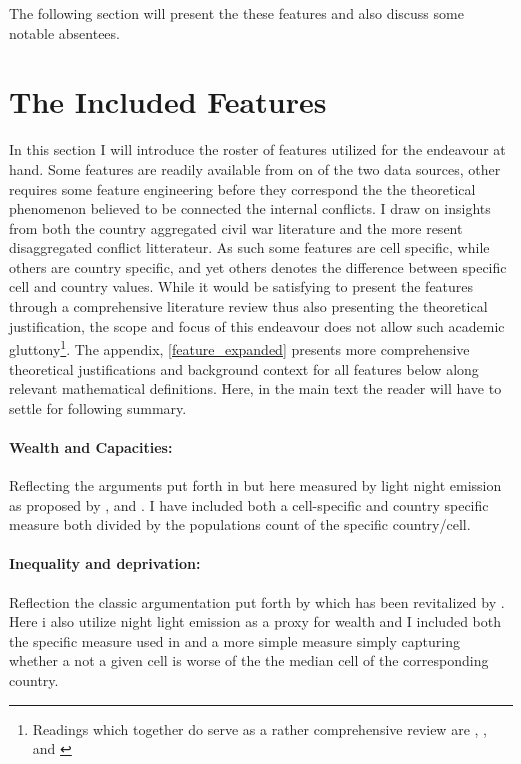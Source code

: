 \documentclass[a4paper]{article}
\begin{document}
The following section will present the these features and also discuss some notable absentees.\par

\section{The Included Features}

In this section I will introduce the roster of features utilized for the endeavour at hand. Some features are readily available from on of the two data sources, other requires some feature engineering before they correspond the the theoretical phenomenon believed to be connected the internal conflicts. I draw on insights from both the country aggregated civil war literature and the more resent disaggregated conflict litterateur. As such some features are cell specific, while others are country specific, and yet others denotes the difference between specific cell and country values. While it would be satisfying to present the features through a comprehensive literature review thus also presenting the theoretical justification, the scope and focus of this endeavour does not allow such academic gluttony\footnote{Readings which together do serve as a rather comprehensive review are \cite{Hegre_Sambanis_2006}, \cite{Kalyvas_2007}, \cite{Cederman_Gleditsch_2009} and \cite{Blattman_Miguel_2010}}. The appendix, \autoref{feature_expanded} presents more comprehensive theoretical justifications and background context for all features below along relevant mathematical definitions. Here, in the main text the reader will have to settle for following summary.

\paragraph{Wealth and Capacities:} Reflecting the arguments put forth in \cite{Collier_Hoeffler_1998, Fearon_Laitin_2003, Collier_Hoeffler_2004} but here measured by light night emission as proposed by \cite{Elvidge_2009}, \cite{Chen_Nordhuas_2011} and \cite{Cederman_Gleditsch_Buhaug_2013}. I have included both a cell-specific and country specific measure both divided by the populations count of the specific country/cell.\par

\paragraph{Inequality and deprivation:} Reflection the classic argumentation put forth by \cite{Gurr_1970} which has been revitalized by \cite{Cederman_Gleditsch_Buhaug_2013}. Here i also utilize night light emission as a proxy for wealth and I included both the specific measure used in \cite{Cederman_Gleditsch_Buhaug_2013} and a more simple measure simply capturing whether a not a given cell is worse of the the median cell of the corresponding country.\par
\end{document}
